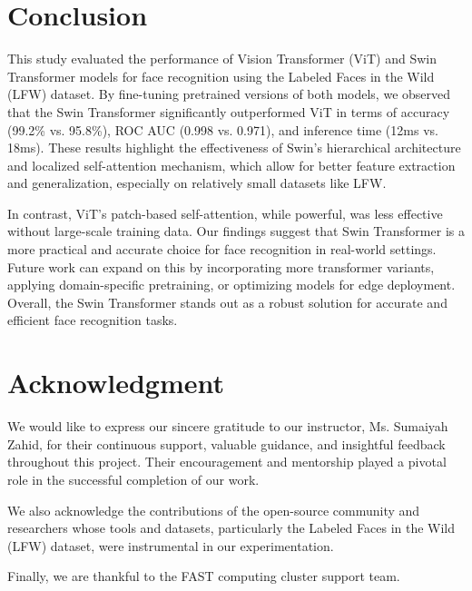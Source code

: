 \documentclass[twocolumn]{IEEEtran}
\begin{document}
\section{Conclusion}
\setlength{\parindent}{4em}
This study evaluated the performance of Vision Transformer (ViT) and Swin Transformer models for face recognition using the Labeled Faces in the Wild (LFW) dataset. By fine-tuning pretrained versions of both models, we observed that the Swin Transformer significantly outperformed ViT in terms of accuracy (99.2\% vs. 95.8\%), ROC AUC (0.998 vs. 0.971), and inference time (12ms vs. 18ms). These results highlight the effectiveness of Swin’s hierarchical architecture and localized self-attention mechanism, which allow for better feature extraction and generalization, especially on relatively small datasets like LFW.

In contrast, ViT’s patch-based self-attention, while powerful, was less effective without large-scale training data. Our findings suggest that Swin Transformer is a more practical and accurate choice for face recognition in real-world settings. Future work can expand on this by incorporating more transformer variants, applying domain-specific pretraining, or optimizing models for edge deployment. Overall, the Swin Transformer stands out as a robust solution for accurate and efficient face recognition tasks.



\section*{Acknowledgment}
\setlength{\parindent}{0pt}
We would like to express our sincere gratitude to our instructor, Ms. Sumaiyah Zahid, for their continuous support, valuable guidance, and insightful feedback throughout this project. Their encouragement and mentorship played a pivotal role in the successful completion of our work.

We also acknowledge the contributions of the open-source community and researchers whose tools and datasets, particularly the Labeled Faces in the Wild (LFW) dataset, were instrumental in our experimentation.

Finally, we are thankful to the FAST computing cluster support team.
\end{document}
